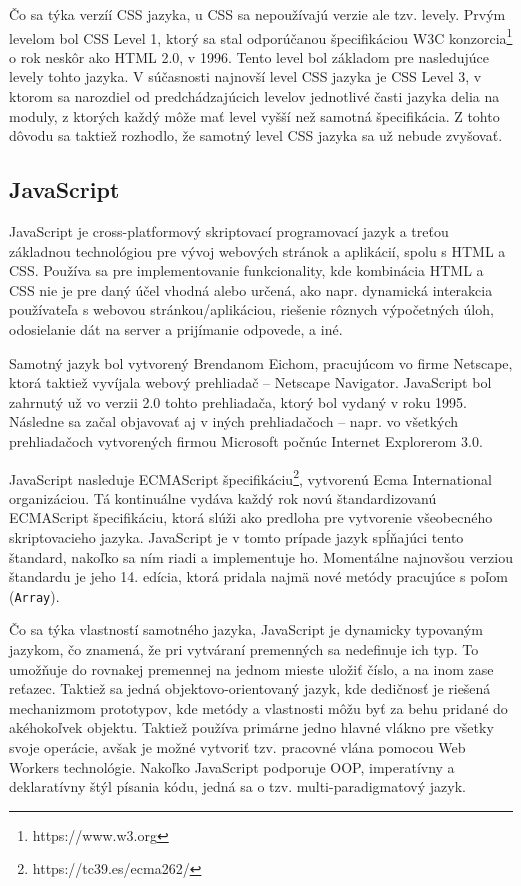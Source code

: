 Čo sa týka verzíí CSS jazyka, u CSS sa nepoužívajú verzie ale tzv. levely. Prvým levelom bol CSS Level 1, ktorý sa stal odporúčanou špecifikáciou W3C konzorcia\footnote{https://www.w3.org} o rok neskôr ako HTML 2.0, v 1996. Tento level bol základom pre nasledujúce levely tohto jazyka. V súčasnosti najnovší level CSS jazyka je CSS Level 3, v ktorom sa narozdiel od predchádzajúcich levelov jednotlivé časti jazyka delia na moduly, z ktorých každý môže mať level vyšší než samotná špecifikácia. Z tohto dôvodu sa taktiež rozhodlo, že samotný level CSS jazyka sa už nebude zvyšovať.

\subsection {JavaScript}
JavaScript je cross-platformový skriptovací programovací jazyk a treťou základnou technológiou pre vývoj webových stránok a aplikácií, spolu s HTML a CSS. Používa sa pre implementovanie funkcionality, kde kombinácia HTML a CSS nie je pre daný účel vhodná alebo určená, ako napr. dynamická interakcia používateľa s webovou stránkou/aplikáciou, riešenie rôznych výpočetných úloh, odosielanie dát na server a prijímanie odpovede, a iné.

Samotný jazyk bol vytvorený Brendanom Eichom, pracujúcom vo firme Netscape, ktorá taktiež vyvíjala webový prehliadač -- Netscape Navigator. JavaScript bol zahrnutý už vo verzii 2.0 tohto prehliadača, ktorý bol vydaný v roku 1995. Následne sa začal objavovať aj v iných prehliadačoch -- napr. vo všetkých prehliadačoch vytvorených firmou Microsoft počnúc Internet Explorerom 3.0. 

JavaScript nasleduje ECMAScript špecifikáciu\footnote{https://tc39.es/ecma262/}, vytvorenú Ecma International organizáciou. Tá kontinuálne vydáva každý rok novú štandardizovanú ECMAScript špecifikáciu, ktorá slúži ako predloha pre vytvorenie všeobecného skriptovacieho jazyka. JavaScript je v tomto prípade jazyk spĺňajúci tento štandard, nakoľko sa ním riadi a implementuje ho. Momentálne najnovšou verziou štandardu je jeho 14. edícia, ktorá pridala najmä nové metódy pracujúce s poľom (\texttt{Array}).

Čo sa týka vlastností samotného jazyka, JavaScript je dynamicky typovaným jazykom, čo znamená, že pri vytváraní premenných sa nedefinuje ich typ. To umožňuje do rovnakej premennej na jednom mieste uložiť číslo, a na inom zase reťazec. Taktiež sa jedná objektovo-orientovaný jazyk, kde dedičnosť je riešená mechanizmom prototypov, kde metódy a vlastnosti môžu byť za behu pridané do akéhokoľvek objektu. Taktiež používa primárne jedno hlavné vlákno pre všetky svoje operácie, avšak je možné vytvoriť tzv. pracovné vlána pomocou Web Workers technológie. Nakoľko JavaScript podporuje OOP, imperatívny a deklaratívny štýl písania kódu, jedná sa o tzv. multi-paradigmatový jazyk.


